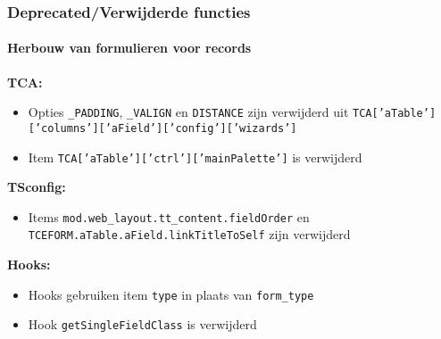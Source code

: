 \begin{frame}[fragile]
	\frametitle{Deprecated/Verwijderde functies}
	\framesubtitle{Herbouw van formulieren voor records}

		\textbf{TCA:}

			\small
			\begin{itemize}

				\item Opties \texttt{\_PADDING}, \texttt{\_VALIGN} en \texttt{DISTANCE}
					zijn verwijderd uit
					\texttt{TCA['aTable']['columns']['aField']['config']['wizards']}

				\item Item \texttt{TCA['aTable']['ctrl']['mainPalette']} is verwijderd

			\end{itemize}

		\textbf{TSconfig:}

			\small
			\begin{itemize}
				\item Items \texttt{mod.web\_layout.tt\_content.fieldOrder} en
					\texttt{TCEFORM.aTable.aField.linkTitleToSelf} zijn verwijderd
			\end{itemize}

		\textbf{Hooks:}

			\small
			\begin{itemize}
				\item Hooks gebruiken item \texttt{type} in plaats van \texttt{form\_type}
				\item Hook \texttt{getSingleFieldClass} is verwijderd
			\end{itemize}

\end{frame}


